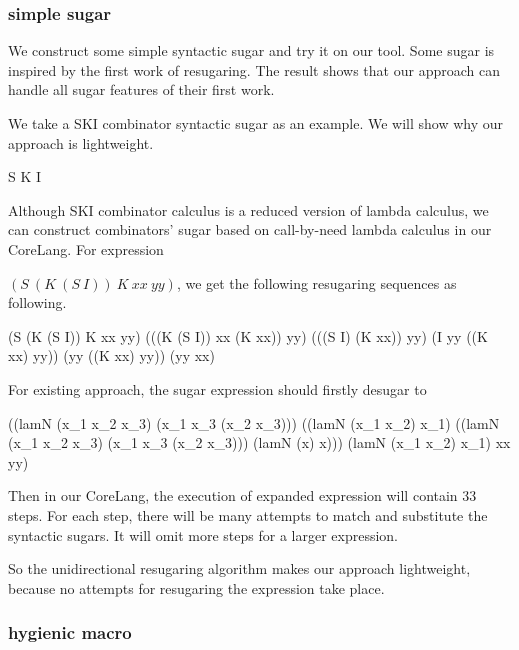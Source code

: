 \subsubsection{simple sugar}
\label{mark:simple}

We construct some simple syntactic sugar and try it on our tool. Some sugar is inspired by the first work of resugaring\cite{resugaring}. The result shows that our approach can handle all sugar features of their first work.

We take a SKI combinator syntactic sugar as an example. We will show why our approach is lightweight.
\begin{Codes}
	S 
	K 
	I 
\end{Codes}



Although SKI combinator calculus is a reduced version of lambda calculus, we can construct combinators' sugar based on call-by-need lambda calculus in our CoreLang. For expression

 $(S~(K~(S~I))~K~xx~yy)$, we get the following resugaring sequences as following.
\begin{Codes}
    (S (K (S I)) K xx yy)
\CoreStep (((K (S I)) xx (K xx)) yy)
\CoreStep (((S I) (K xx)) yy)
\CoreStep (I yy ((K xx) yy))
\CoreStep (yy ((K xx) yy))
\CoreStep (yy xx)
\end{Codes}


For existing approach, the sugar expression should firstly desugar to
\begin{Codes}
((lamN
   (x_{1} x_{2} x_{3})
   (x_{1} x_{3} (x_{2} x_{3})))
  ((lamN (x_{1} x_{2}) x_{1})
   ((lamN
     (x_{1} x_{2} x_{3})
     (x_{1} x_{3} (x_{2} x_{3})))
    (lamN (x) x)))
  (lamN (x_{1} x_{2}) x_{1})
  xx yy)
\end{Codes}

Then in our CoreLang, the execution of expanded expression will contain 33 steps. For each step, there will be many attempts to match and substitute the syntactic sugars. It will omit more steps for a larger expression.

So the unidirectional resugaring algorithm makes our approach lightweight, because no attempts for resugaring the expression take place.
\subsubsection{hygienic macro}
\label{mark:hygienic}

